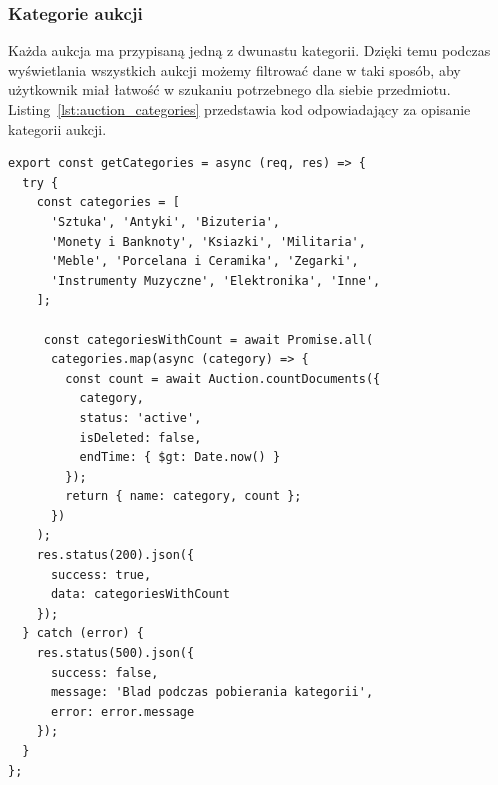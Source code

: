 \subsubsection{Kategorie aukcji}
Każda aukcja ma przypisaną jedną z dwunastu kategorii. Dzięki temu podczas wyświetlania wszystkich aukcji możemy filtrować dane w taki sposób, aby użytkownik miał łatwość w szukaniu potrzebnego dla siebie przedmiotu. Listing~\ref{lst:auction_categories} przedstawia kod odpowiadający za opisanie kategorii aukcji.
\begin{lstlisting}[style=javascript, caption = {Obsługa wyświetlania aukcji}, label = {lst:auction_categories}]
export const getCategories = async (req, res) => {
  try {
    const categories = [
      'Sztuka', 'Antyki', 'Bizuteria',
      'Monety i Banknoty', 'Ksiazki', 'Militaria',
      'Meble', 'Porcelana i Ceramika', 'Zegarki',
      'Instrumenty Muzyczne', 'Elektronika', 'Inne',
    ];
    
     const categoriesWithCount = await Promise.all(
      categories.map(async (category) => {
        const count = await Auction.countDocuments({
          category,
          status: 'active',
          isDeleted: false,
          endTime: { $gt: Date.now() }
        });
        return { name: category, count };
      })
    );
    res.status(200).json({
      success: true,
      data: categoriesWithCount
    });
  } catch (error) {
    res.status(500).json({
      success: false,
      message: 'Blad podczas pobierania kategorii',
      error: error.message
    });
  }
};
\end{lstlisting}


